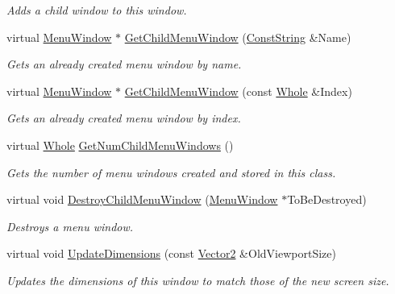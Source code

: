 \begin{DoxyCompactItemize}
\begin{DoxyCompactList}\small\item\em Adds a child window to this window. \item\end{DoxyCompactList}\item 
virtual \hyperlink{classphys_1_1UI_1_1MenuWindow}{MenuWindow} $\ast$ \hyperlink{classphys_1_1UI_1_1MenuWindow_ad1136c4e4b2ff9b9dc5d6aac2dba45a7}{GetChildMenuWindow} (\hyperlink{namespacephys_a5ce5049f8b4bf88d6413c47b504ebb31}{ConstString} \&Name)
\begin{DoxyCompactList}\small\item\em Gets an already created menu window by name. \item\end{DoxyCompactList}\item 
virtual \hyperlink{classphys_1_1UI_1_1MenuWindow}{MenuWindow} $\ast$ \hyperlink{classphys_1_1UI_1_1MenuWindow_af05d6512de0370e24638d6fe2dbc69cc}{GetChildMenuWindow} (const \hyperlink{namespacephys_a460f6bc24c8dd347b05e0366ae34f34a}{Whole} \&Index)
\begin{DoxyCompactList}\small\item\em Gets an already created menu window by index. \item\end{DoxyCompactList}\item 
virtual \hyperlink{namespacephys_a460f6bc24c8dd347b05e0366ae34f34a}{Whole} \hyperlink{classphys_1_1UI_1_1MenuWindow_ab3a6ae708ba2cea16cd0de176e265459}{GetNumChildMenuWindows} ()
\begin{DoxyCompactList}\small\item\em Gets the number of menu windows created and stored in this class. \item\end{DoxyCompactList}\item 
virtual void \hyperlink{classphys_1_1UI_1_1MenuWindow_ace2796c2d250fe1582f7c43333a7295e}{DestroyChildMenuWindow} (\hyperlink{classphys_1_1UI_1_1MenuWindow}{MenuWindow} $\ast$ToBeDestroyed)
\begin{DoxyCompactList}\small\item\em Destroys a menu window. \item\end{DoxyCompactList}\item 
virtual void \hyperlink{classphys_1_1UI_1_1MenuWindow_a9845f7bd61f5c3f06594c4bbcbd4e063}{UpdateDimensions} (const \hyperlink{classphys_1_1Vector2}{Vector2} \&OldViewportSize)
\begin{DoxyCompactList}\small\item\em Updates the dimensions of this window to match those of the new screen size. \item\end{DoxyCompactList}\end{DoxyCompactItemize}
